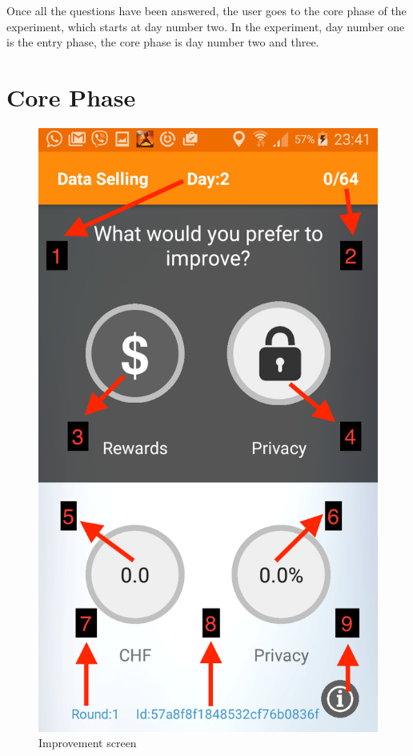Once all the questions have been answered, the user goes to the core phase of the experiment, which starts at day number two. In the experiment, day number one is the entry phase, the core phase is day number two and three.

\section{Core Phase} \label{core}

\begin{figure}[ht!]
\centering
\includegraphics[width=\textwidth,keepaspectratio]{./images/improve}
\caption{Improvement screen }
\label{fig:imp}
\end{figure}

